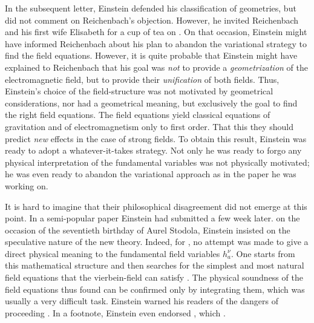 \documentclass[draft]{article}
\newcommand{\vbein}{vierbein\xspace}
\newcommand{\hbein}{\ensuremath{h_{a}^{\nu}}\xspace}
\newcommand{\FP}{\german{Fernparallelismus}\xspace}
\begin{document}
In the subsequent letter, Einstein defended his classification of geometries, but did not comment on Reichenbach's objection. However, he invited Reichenbach and his first wife Elisabeth for a cup of tea on . On that occasion, Einstein might have informed Reichenbach about his plan to abandon the variational strategy to find the field equations. However, it is quite probable that Einstein might have explained to Reichenbach that his goal was \emph{not} to provide a \emph{geometrization} of the electromagnetic field, but to provide their \emph{unification} of both fields. Thus, Einstein's choice of the field-structure was not motivated by geometrical considerations, nor had a geometrical meaning, but exclusively the goal to find the right field equations. The field equations yield classical equations of gravitation and of electromagnetism only to first order. That this they should predict \emph{new} effects in the case of strong fields. To obtain this result, Einstein was ready to adopt a whatever-it-takes strategy. Not only  he was ready to forgo any physical interpretation of the fundamental variables was not physically motivated; he was even ready to abandon the variational approach as in the paper he was working on. 

It is hard to imagine that their philosophical disagreement did not emerge at this point. In a semi-popular paper Einstein had submitted a few week later.  on the occasion of the seventieth birthday of Aurel Stodola\label{stodola}, Einstein insisted on the speculative nature of the new theory. Indeed, for \FP, no attempt was made to give a direct physical meaning to the fundamental field variables \hbein. One starts from this mathematical structure and then searches for the simplest and most natural field equations that the \vbein-field can satisfy \citep[131]{Einstein1929}. The physical soundness of the field equations thus found can be confirmed only by integrating them, which was usually a very difficult task. Einstein warned his readers of the dangers of proceeding  \citep[127]{Einstein1929}. In a footnote, Einstein even endorsed , which  \citep[127]{Einstein1929}.
\end{document}
